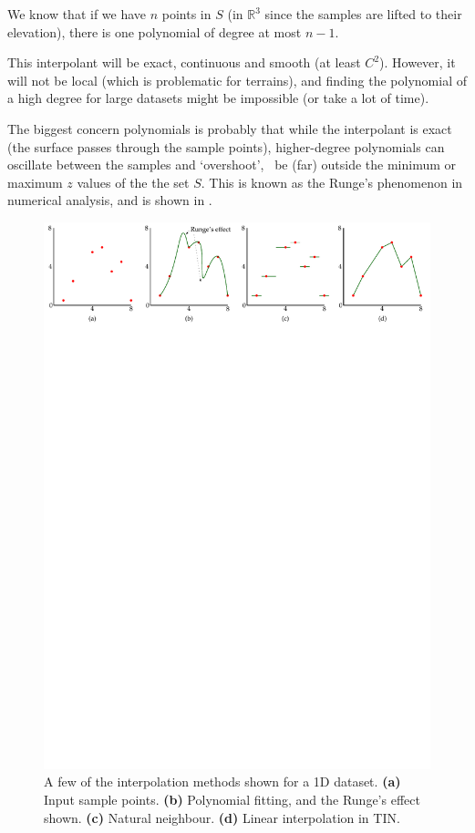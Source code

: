 We know that if we have $n$ points in $S$ (in $\mathbb{R}^3$ since the samples are lifted to their elevation), there is one polynomial of degree at most $n-1$.

This interpolant will be exact, continuous and smooth (at least $C^2$).
However, it will not be local (which is problematic for terrains), and finding the polynomial of a high degree for large datasets might be impossible (or take a lot of time).

The biggest concern polynomials is probably that while the interpolant is exact (the surface passes through the sample points), higher-degree polynomials can oscillate between the samples and `overshoot', \ie\ be (far) outside the minimum or maximum $z$ values of the the set $S$.
This is known as the Runge's phenomenon in numerical analysis, and is shown in .
\begin{figure}
  \centering
  \includegraphics[width=\linewidth]{figs/polynomial}
  \caption{A few of the interpolation methods shown for a 1D dataset. \textbf{(a)} Input sample points. \textbf{(b)} Polynomial fitting, and the Runge's effect shown. \textbf{(c)} Natural neighbour. \textbf{(d)} Linear interpolation in TIN.}%
\end{figure}



